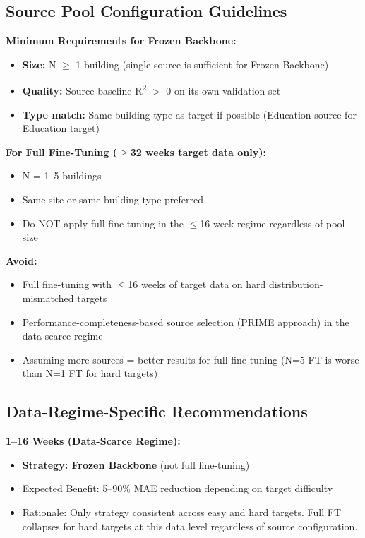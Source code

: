 \documentclass[12pt,a4paper]{report}
\begin{document}
\subsection{Source Pool Configuration Guidelines}

\textbf{Minimum Requirements for Frozen Backbone:}
\begin{itemize}
    \item \textbf{Size:} N $\geq$ 1 building (single source is sufficient for Frozen Backbone)
    \item \textbf{Quality:} Source baseline R\textsuperscript{2} $>$ 0 on its own validation set
    \item \textbf{Type match:} Same building type as target if possible (Education source for Education target)
\end{itemize}

\textbf{For Full Fine-Tuning ($\geq$32 weeks target data only):}
\begin{itemize}
    \item N = 1--5 buildings
    \item Same site or same building type preferred
    \item Do NOT apply full fine-tuning in the $\leq$16 week regime regardless of pool size
\end{itemize}

\textbf{Avoid:}
\begin{itemize}
    \item Full fine-tuning with $\leq$16 weeks of target data on hard distribution-mismatched targets
    \item Performance-completeness-based source selection (PRIME approach) in the data-scarce regime
    \item Assuming more sources = better results for full fine-tuning (N=5 FT is worse than N=1 FT for hard targets)
\end{itemize}

\subsection{Data-Regime-Specific Recommendations}

\textbf{1--16 Weeks (Data-Scarce Regime):}
\begin{itemize}
    \item \textbf{Strategy: Frozen Backbone} (not full fine-tuning)
    \item Expected Benefit: 5--90\% MAE reduction depending on target difficulty
    \item Rationale: Only strategy consistent across easy and hard targets. Full FT collapses for hard targets at this data level regardless of source configuration.
\end{itemize}
\end{document}
